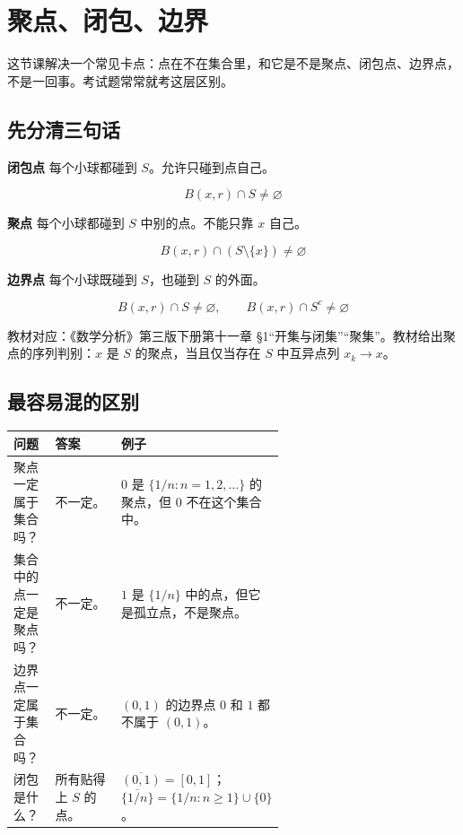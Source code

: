 \section{聚点、闭包、边界}

这节课解决一个常见卡点：点在不在集合里，和它是不是聚点、闭包点、边界点，不是一回事。考试题常常就考这层区别。

\subsection*{先分清三句话}

\begin{conceptbox}
\textbf{闭包点}
每个小球都碰到 \(S\)。允许只碰到点自己。

\[
          B(x,r)\cap S\ne\varnothing
        \]
\end{conceptbox}

\begin{conceptbox}
\textbf{聚点}
每个小球都碰到 \(S\) 中别的点。不能只靠 \(x\) 自己。

\[
          B(x,r)\cap(S\setminus\{x\})\ne\varnothing
        \]
\end{conceptbox}

\begin{conceptbox}
\textbf{边界点}
每个小球既碰到 \(S\)，也碰到 \(S\) 的外面。

\[
          B(x,r)\cap S\ne\varnothing,\qquad B(x,r)\cap S^c\ne\varnothing
        \]
\end{conceptbox}

教材对应：《数学分析》第三版下册第十一章 §1“开集与闭集”“聚集”。教材给出聚点的序列判别：\(x\) 是 \(S\) 的聚点，当且仅当存在 \(S\) 中互异点列 \(x_k\to x\)。

\subsection*{最容易混的区别}

\begin{center}
\small
\begin{tabularx}{\linewidth}{|>{\raggedright\arraybackslash}p{0.18\linewidth}|>{\raggedright\arraybackslash}p{0.42\linewidth}|>{\raggedright\arraybackslash}X|}
\hline
\textbf{问题} & \textbf{答案} & \textbf{例子} \\ \hline
聚点一定属于集合吗？ & 不一定。 & \(0\) 是 \(\{1/n:n=1,2,\ldots\}\) 的聚点，但 \(0\) 不在这个集合中。 \\ \hline
集合中的点一定是聚点吗？ & 不一定。 & \(1\) 是 \(\{1/n\}\) 中的点，但它是孤立点，不是聚点。 \\ \hline
边界点一定属于集合吗？ & 不一定。 & \((0,1)\) 的边界点 \(0\) 和 \(1\) 都不属于 \((0,1)\)。 \\ \hline
闭包是什么？ & 所有贴得上 \(S\) 的点。 & \(\overline{(0,1)}=[0,1]\)；\(\overline{\{1/n\}}=\{1/n:n\ge1\}\cup\{0\}\)。 \\ \hline
\end{tabularx}
\end{center}

